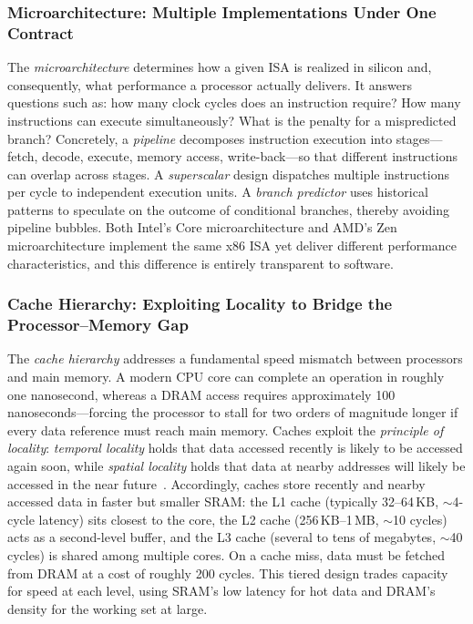 \documentclass[11pt,a4paper]{article}
\begin{document}
\subsubsection{Microarchitecture: Multiple Implementations Under One Contract}

The \textit{microarchitecture} determines how a given ISA is realized in silicon and, consequently, what performance a processor actually delivers.
It answers questions such as: how many clock cycles does an instruction require? How many instructions can execute simultaneously? What is the penalty for a mispredicted branch?
Concretely, a \emph{pipeline} decomposes instruction execution into stages---fetch, decode, execute, memory access, write-back---so that different instructions can overlap across stages.
A \emph{superscalar} design dispatches multiple instructions per cycle to independent execution units.
A \emph{branch predictor} uses historical patterns to speculate on the outcome of conditional branches, thereby avoiding pipeline bubbles.
Both Intel's Core microarchitecture and AMD's Zen microarchitecture implement the same x86 ISA yet deliver different performance characteristics, and this difference is entirely transparent to software.

\subsubsection{Cache Hierarchy: Exploiting Locality to Bridge the Processor--Memory Gap}

The \textit{cache hierarchy} addresses a fundamental speed mismatch between processors and main memory.
A modern CPU core can complete an operation in roughly one nanosecond, whereas a DRAM access requires approximately 100 nanoseconds---forcing the processor to stall for two orders of magnitude longer if every data reference must reach main memory.
Caches exploit the \emph{principle of locality}: \emph{temporal locality} holds that data accessed recently is likely to be accessed again soon, while \emph{spatial locality} holds that data at nearby addresses will likely be accessed in the near future~\cite{drepper2007memory}.
Accordingly, caches store recently and nearby accessed data in faster but smaller SRAM: the L1 cache (typically 32--64\,KB, $\sim$4-cycle latency) sits closest to the core, the L2 cache (256\,KB--1\,MB, $\sim$10 cycles) acts as a second-level buffer, and the L3 cache (several to tens of megabytes, $\sim$40 cycles) is shared among multiple cores.
On a cache miss, data must be fetched from DRAM at a cost of roughly 200 cycles.
This tiered design trades capacity for speed at each level, using SRAM's low latency for hot data and DRAM's density for the working set at large.
\end{document}
